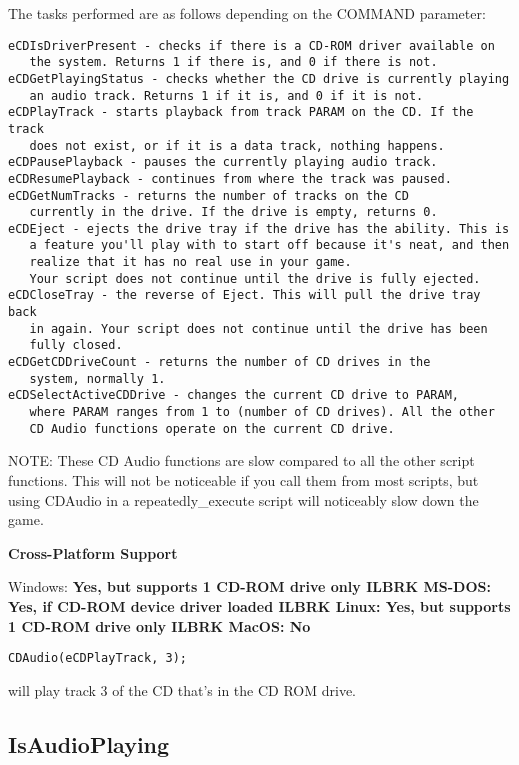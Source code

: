 The tasks performed are as follows depending on the COMMAND parameter:
\begin{verbatim}
eCDIsDriverPresent - checks if there is a CD-ROM driver available on
   the system. Returns 1 if there is, and 0 if there is not.
eCDGetPlayingStatus - checks whether the CD drive is currently playing
   an audio track. Returns 1 if it is, and 0 if it is not.
eCDPlayTrack - starts playback from track PARAM on the CD. If the track
   does not exist, or if it is a data track, nothing happens.
eCDPausePlayback - pauses the currently playing audio track.
eCDResumePlayback - continues from where the track was paused.
eCDGetNumTracks - returns the number of tracks on the CD
   currently in the drive. If the drive is empty, returns 0.
eCDEject - ejects the drive tray if the drive has the ability. This is
   a feature you'll play with to start off because it's neat, and then
   realize that it has no real use in your game.
   Your script does not continue until the drive is fully ejected.
eCDCloseTray - the reverse of Eject. This will pull the drive tray back
   in again. Your script does not continue until the drive has been
   fully closed.
eCDGetCDDriveCount - returns the number of CD drives in the
   system, normally 1.
eCDSelectActiveCDDrive - changes the current CD drive to PARAM,
   where PARAM ranges from 1 to (number of CD drives). All the other
   CD Audio functions operate on the current CD drive.
\end{verbatim}
NOTE: These CD Audio functions are slow compared to all the other script
functions. This will not be noticeable if you call them from most scripts,
but using CDAudio in a repeatedly_execute script will noticeably slow down
the game.

\bf{Cross-Platform Support}

Windows: \bf{ Yes, but supports 1 CD-ROM drive only }ILBRK
MS-DOS: \bf{ Yes, if CD-ROM device driver loaded }ILBRK
Linux: \bf{ Yes, but supports 1 CD-ROM drive only }ILBRK
MacOS: \bf{ No }

\begin{verbatim}
CDAudio(eCDPlayTrack, 3);
\end{verbatim}
will play track 3 of the CD that's in the CD ROM drive.


\subsection{IsAudioPlaying}\label{Game.IsAudioPlaying}%

